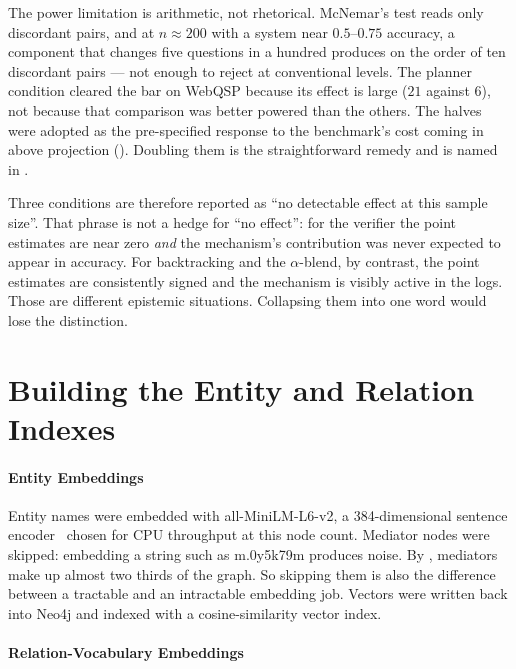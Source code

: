 The power limitation is arithmetic, not rhetorical. McNemar's test reads only
discordant pairs, and at $n \approx 200$ with a system near $0.5$--$0.75$
accuracy, a component that changes five questions in a hundred produces on the
order of ten discordant pairs --- not enough to reject at conventional levels.
The planner condition cleared the bar on WebQSP because its effect is large
($21$ against $6$), not because that comparison was better powered than the
others. The halves were adopted as the pre-specified response to the
benchmark's cost coming in above projection ().
Doubling them is the straightforward remedy and is named in
.

Three conditions are therefore reported as ``no detectable effect at this sample
size''. That phrase is not a hedge for ``no effect'': for the verifier the point
estimates are near zero \emph{and} the mechanism's contribution was never
expected to appear in accuracy. For backtracking and the $\alpha$-blend, by
contrast, the point estimates are consistently signed and the mechanism is
visibly active in the logs. Those are different epistemic situations. Collapsing
them into one word would lose the distinction.


\section{Building the Entity and Relation Indexes}\label{app:index-build}

\paragraph{Entity Embeddings}

Entity names were embedded with \textsf{all-MiniLM-L6-v2}, a 384-dimensional
sentence encoder~\cite{reimers2019sentence} chosen for CPU throughput at this
node count. Mediator nodes were skipped: embedding a string such as
\textsf{m.0y5k79m} produces noise. By , mediators
make up almost two thirds of the graph. So skipping them is also the
difference between a tractable and an intractable embedding job. Vectors were
written back into Neo4j and indexed with a cosine-similarity vector index.

\paragraph{Relation-Vocabulary Embeddings}

